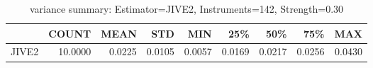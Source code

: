 \begin{table}[ht]
\centering
\caption{variance summary: Estimator=JIVE2, Instruments=142, Strength=0.30}
\begin{tabular}{lrrrrrrrr}
\toprule
 & COUNT & MEAN & STD & MIN & 25\% & 50\% & 75\% & MAX \\
\midrule
JIVE2 & 10.0000 & 0.0225 & 0.0105 & 0.0057 & 0.0169 & 0.0217 & 0.0256 & 0.0430 \\
\bottomrule
\end{tabular}
\end{table}
